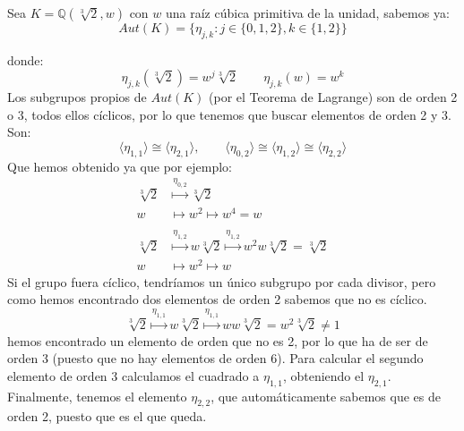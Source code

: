 \begin{ejemplo}
    Sea $K = \mathbb{Q}(\sqrt[3]{2},w)$ con $w$ una raíz cúbica primitiva de la unidad, sabemos ya:
    \begin{equation*}
        Aut(K) = \{\eta_{j,k} : j\in \{0,1,2\}, k \in \{1,2\}\}
    \end{equation*}

    donde:
    \begin{equation*}
        \eta_{j,k}(\sqrt[3]{2}) = w^j \sqrt[3]{2} \qquad \eta_{j,k}(w) = w^k
    \end{equation*}
    Los subgrupos propios de $Aut(K)$ (por el Teorema de Lagrange) son de orden 2 o 3, todos ellos cíclicos, por lo que tenemos que buscar elementos de orden 2 y 3. Son:
    \begin{equation*}
        \langle \eta_{1,1} \rangle  \cong \langle \eta_{2,1} \rangle, \qquad \langle \eta_{0,2} \rangle  \cong \langle \eta_{1,2} \rangle  \cong \langle \eta_{2,2} \rangle 
    \end{equation*}
    Que hemos obtenido ya que por ejemplo:
    \begin{align*}
        \sqrt[3]{2} &\stackrel{\eta_{0,2}}{\longmapsto} \sqrt[3]{2} \\
        w &\longmapsto w^2 \longmapsto w^4 = w \\
        \\
        \sqrt[3]{2} &\stackrel{\eta_{1,2}}{\longmapsto} w\sqrt[3]{2} \stackrel{\eta_{1,2}}{\longmapsto} w^2 w\sqrt[3]{2} = \sqrt[3]{2} \\
        w &\longmapsto w^2 \longmapsto w 
    \end{align*}
    Si el grupo fuera cíclico, tendríamos un único subgrupo por cada divisor, pero como hemos encontrado dos elementos de orden 2 sabemos que no es cíclico.
    \begin{equation*}
        \sqrt[3]{2} \stackrel{\eta_{1,1}}{\longmapsto} w\sqrt[3]{2} \stackrel{\eta_{1,1}}{\longmapsto} ww\sqrt[3]{2} = w^2\sqrt[3]{2} \neq 1
    \end{equation*}
    hemos encontrado un elemento de orden que no es 2, por lo que ha de ser de orden 3 (puesto que no hay elementos de orden 6). Para calcular el segundo elemento de orden 3 calculamos el cuadrado a $\eta_{1,1}$, obteniendo el $\eta_{2,1}$. Finalmente, tenemos el elemento $\eta_{2,2}$, que automáticamente sabemos que es de orden 2, puesto que es el que queda.\\


\end{ejemplo}

